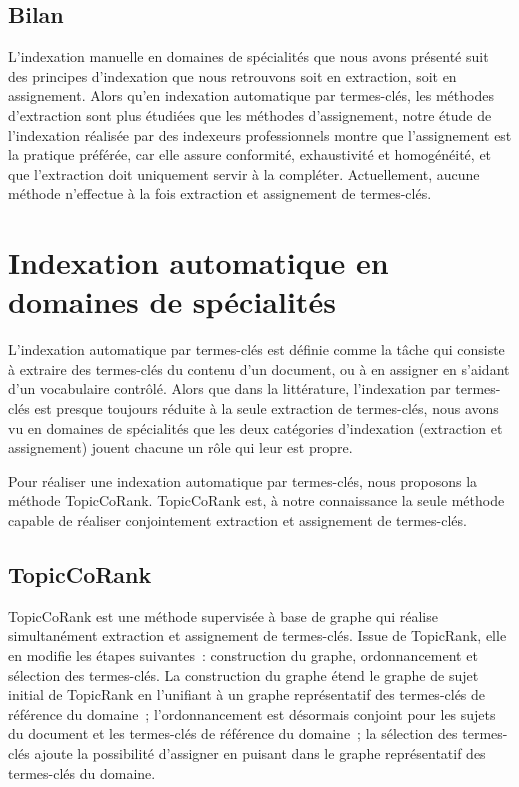     \subsection{Bilan}
    \label{subsec:main-domain_specific_keyphrase_annotation-manual_keyphrase_annotation-conclusion}
      L'indexation manuelle en domaines de spécialités que nous avons présenté
      suit des principes d'indexation que nous retrouvons soit en extraction,
      soit en assignement. Alors qu'en indexation automatique par termes-clés,
      les méthodes d'extraction sont plus étudiées que les méthodes
      d'assignement, notre étude de l'indexation réalisée par des indexeurs
      professionnels montre que l'assignement est la pratique préférée, car elle
      assure conformité, exhaustivité et homogénéité, et que l'extraction doit
      uniquement servir à la compléter. Actuellement, aucune méthode n'effectue
      à la fois extraction et assignement de termes-clés.


  \section{Indexation automatique en domaines de spécialités}
  \label{sec:main-domain_specific_keyphrase_annotation-supervised_automatic_keyphrase_extraction}
    L'indexation automatique par termes-clés est définie comme la tâche qui
    consiste à extraire des termes-clés du contenu d'un document, ou à en
    assigner en s'aidant d'un vocabulaire contrôlé. Alors que dans la
    littérature, l'indexation par termes-clés est presque toujours réduite à la
    seule extraction de termes-clés, nous avons vu en domaines de spécialités
    que les deux catégories d'indexation (extraction et assignement) jouent
    chacune un rôle qui leur est propre.

    Pour réaliser une indexation automatique par termes-clés, nous proposons la
    méthode TopicCoRank. TopicCoRank est, à notre connaissance la seule méthode
    capable de réaliser conjointement extraction et assignement de termes-clés.

    \subsection{TopicCoRank}
    \label{subsec:main-domain_specific_keyphrase_annotation-supervised_automatic_keyphrase_annotation-topiccorank}
      TopicCoRank est une méthode supervisée à base de graphe qui réalise
      simultanément extraction et assignement de termes-clés. Issue de
      TopicRank, elle en modifie les étapes suivantes~: construction du graphe,
      ordonnancement et sélection des termes-clés. La construction du graphe
      étend le graphe de sujet initial de TopicRank en l'unifiant à un graphe
      représentatif des termes-clés de référence du domaine~; l'ordonnancement
      est désormais conjoint pour les sujets du document et les termes-clés de
      référence du domaine~; la sélection des termes-clés ajoute la possibilité
      d'assigner en puisant dans le graphe représentatif des termes-clés du
      domaine.
      
